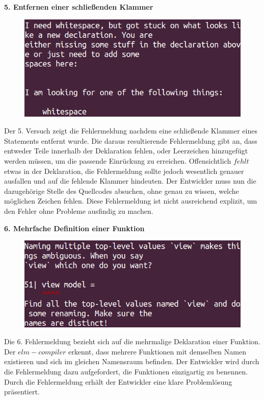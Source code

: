 \textbf{5. Entfernen einer schließenden Klammer}\\
\begin{figure}[h!]
\centering
\includegraphics[scale=0.5]{img/missing-brackets-error.png}
\end{figure}
Der 5. Versuch zeigt die Fehlermeldung nachdem eine schließende Klammer eines Statements entfernt wurde. Die daraus resultierende Fehlermeldung gibt an, dass entweder Teile innerhalb der Deklaration fehlen, oder Leerzeichen hinzugefügt werden müssen, um die passende Einrückung zu erreichen. Offensichtlich $fehlt$ etwas in der Deklaration, die Fehlermeldung sollte jedoch wesentlich genauer ausfallen und auf die fehlende Klammer hindeuten. Der Entwickler muss nun die dazugehörige Stelle des Quellcodes absuchen, ohne genau zu wissen, welche möglichen Zeichen fehlen. Diese Fehlermeldung ist nicht ausreichend explizit, um den Fehler ohne Probleme ausfindig zu machen.

\textbf{6. Mehrfache Definition einer Funktion}\\
\begin{figure}[h!]
\centering
\includegraphics[scale=0.5]{img/multiple-function-definitions.png}
\end{figure}
Die 6. Fehlermeldung bezieht sich auf die mehrmalige Deklaration einer Funktion. Der $elm-compiler$ erkennt, dass mehrere Funktionen mit demselben Namen existieren und sich im gleichen Namensraum befinden. Der Entwickler wird durch die Fehlermeldung dazu aufgefordert, die Funktionen einzigartig zu benennen. Durch die Fehlermeldung erhält der Entwickler eine klare Problemlösung präsentiert.

